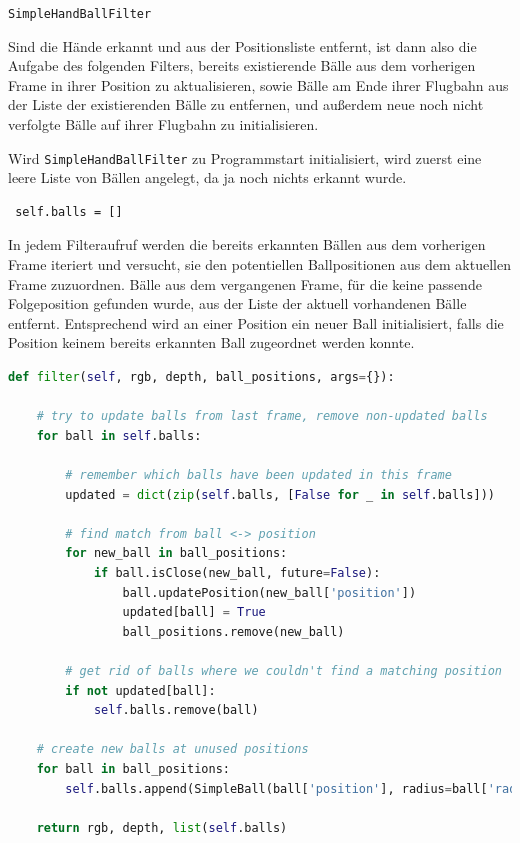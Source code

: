 \documentclass[12pt,a4paper,ngerman]{scrartcl}
\begin{document}
\lstinline{SimpleHandBallFilter}

Sind die Hände erkannt und aus der Positionsliste entfernt, ist dann also die
Aufgabe des folgenden Filters, bereits existierende Bälle aus dem vorherigen Frame in ihrer Position zu aktualisieren, sowie Bälle am Ende ihrer Flugbahn aus der Liste der existierenden Bälle zu entfernen, und außerdem neue noch nicht verfolgte Bälle auf ihrer Flugbahn zu initialisieren.

Wird \lstinline{SimpleHandBallFilter} zu Programmstart initialisiert, wird zuerst eine leere Liste von Bällen angelegt, da ja noch nichts erkannt wurde.

\begin{lstlisting}
 self.balls = []
\end{lstlisting}

In jedem Filteraufruf werden die bereits erkannten Bällen aus dem vorherigen Frame iteriert und versucht, sie den potentiellen Ballpositionen aus dem aktuellen Frame zuzuordnen.
Bälle aus dem vergangenen Frame, für die keine passende Folgeposition gefunden wurde, aus der Liste der aktuell vorhandenen Bälle entfernt.
Entsprechend wird an einer Position ein
neuer Ball initialisiert, falls die Position keinem bereits erkannten Ball zugeordnet werden konnte.

\begin{lstlisting}[language=Python,caption={\lstinline{SimpleHandBall.py}, Ausschnitt}]
def filter(self, rgb, depth, ball_positions, args={}):

    # try to update balls from last frame, remove non-updated balls
    for ball in self.balls:

        # remember which balls have been updated in this frame
        updated = dict(zip(self.balls, [False for _ in self.balls]))

        # find match from ball <-> position
        for new_ball in ball_positions:
            if ball.isClose(new_ball, future=False):
                ball.updatePosition(new_ball['position'])
                updated[ball] = True
                ball_positions.remove(new_ball)

        # get rid of balls where we couldn't find a matching position
        if not updated[ball]:
            self.balls.remove(ball)

    # create new balls at unused positions
    for ball in ball_positions:
        self.balls.append(SimpleBall(ball['position'], radius=ball['radius']))

    return rgb, depth, list(self.balls)
\end{lstlisting}
\end{document}
